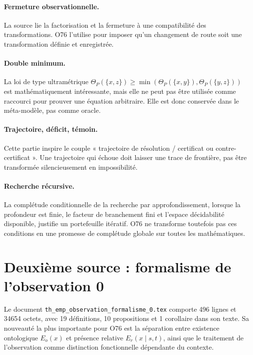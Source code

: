 \documentclass[11pt,a4paper]{article}
\begin{document}
\paragraph{Fermeture observationnelle.} La source lie la factorisation et la fermeture à une compatibilité des transformations. O76 l'utilise pour imposer qu'un changement de route soit une transformation définie et enregistrée.

\paragraph{Double minimum.} La loi de type ultramétrique $\Theta_P(\{x,z\})\geq\min(\Theta_P(\{x,y\}),\Theta_P(\{y,z\}))$ est mathématiquement intéressante, mais elle ne peut pas être utilisée comme raccourci pour prouver une équation arbitraire. Elle est donc conservée dans le méta-modèle, pas comme oracle.

\paragraph{Trajectoire, déficit, témoin.} Cette partie inspire le couple « trajectoire de résolution / certificat ou contre-certificat ». Une trajectoire qui échoue doit laisser une trace de frontière, pas être transformée silencieusement en impossibilité.

\paragraph{Recherche récursive.} La complétude conditionnelle de la recherche par approfondissement, lorsque la profondeur est finie, le facteur de branchement fini et l'espace décidabilité disponible, justifie un portefeuille itératif. O76 ne transforme toutefois pas ces conditions en une promesse de complétude globale sur toutes les mathématiques.

\section{Deuxième source : formalisme de l'observation 0}
Le document \texttt{th\_emp\_observation\_formalisme\_0.tex} comporte 496 lignes et 34654 octets, avec 19 définitions, 10 propositions et 1 corollaire dans son texte. Sa nouveauté la plus importante pour O76 est la séparation entre existence ontologique $E_o(x)$ et présence relative $E_r(x\mid s,t)$, ainsi que le traitement de l'observation comme distinction fonctionnelle dépendante du contexte.
\end{document}
